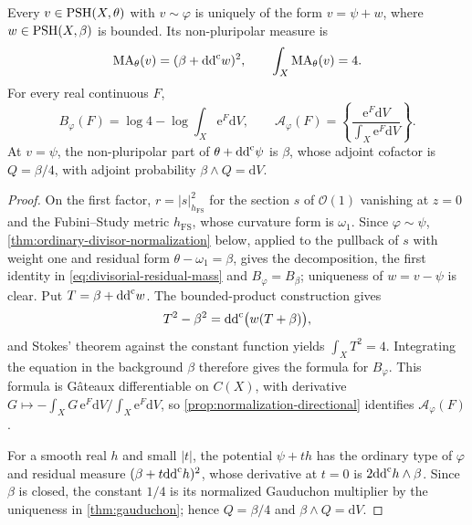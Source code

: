 \begin{proposition}\label{prop:divisorial-residual-adjoint}
Every $v\in\mathrm{PSH}(X,\theta)$ with $v\sim\varphi$ is uniquely of the form $v=\psi+w$, where $w\in\mathrm{PSH}(X,\beta)$ is bounded. Its non-pluripolar measure is
\begin{equation}\label{eq:divisorial-residual-mass}
 \mathrm{MA}_\theta(v)=(\beta+\mathrm{dd}^{\mathrm{c}} w)^2,\qquad
 \int_X\mathrm{MA}_\theta(v)=4.
\end{equation}
For every real continuous $F$,
\[
 B_\varphi(F)=\log4-\log\int_X\mathrm e^F\mathrm dV,
 \qquad
 \mathcal A_\varphi(F)=
 \left\{\frac{\mathrm e^F\mathrm dV}{\int_X\mathrm e^F\mathrm dV}\right\}.
\]
At $v=\psi$, the non-pluripolar part of $\theta+\mathrm{dd}^{\mathrm{c}}\psi$ is $\beta$, whose adjoint cofactor is $Q=\beta/4$, with adjoint probability $\beta\wedge Q=\mathrm dV$.
\end{proposition}
\begin{proof}
On the first factor, $r=|s|_{h_{\mathrm{FS}}}^2$ for the section $s$ of $\mathcal O(1)$ vanishing at $z=0$ and the Fubini--Study metric $h_{\mathrm{FS}}$, whose curvature form is $\omega_1$. Since $\varphi\sim\psi$, \cref{thm:ordinary-divisor-normalization} below, applied to the pullback of $s$ with weight one and residual form $\theta-\omega_1=\beta$, gives the decomposition, the first identity in \eqref{eq:divisorial-residual-mass} and $B_\varphi=B_\beta$; uniqueness of $w=v-\psi$ is clear. Put $T=\beta+\mathrm{dd}^{\mathrm{c}} w$. The bounded-product construction gives
\[
 T^2-\beta^2=\mathrm{dd}^{\mathrm{c}}\bigl(w(T+\beta)\bigr),
\]
and Stokes' theorem against the constant function yields $\int_XT^2=4$. Integrating the equation in the background $\beta$ therefore gives the formula for $B_\varphi$. This formula is G\^ateaux differentiable on $C(X)$, with derivative $G\mapsto-\int_XG\,\mathrm e^F\mathrm dV/\int_X\mathrm e^F\mathrm dV$, so \cref{prop:normalization-directional} identifies $\mathcal A_\varphi(F)$.

For a smooth real $h$ and small $|t|$, the potential $\psi+th$ has the ordinary type of $\varphi$ and residual measure $(\beta+t\mathrm{dd}^{\mathrm{c}} h)^2$, whose derivative at $t=0$ is $2\mathrm{dd}^{\mathrm{c}} h\wedge\beta$. Since $\beta$ is closed, the constant $1/4$ is its normalized Gauduchon multiplier by the uniqueness in \cref{thm:gauduchon}; hence $Q=\beta/4$ and $\beta\wedge Q=\mathrm dV$.
\end{proof}

